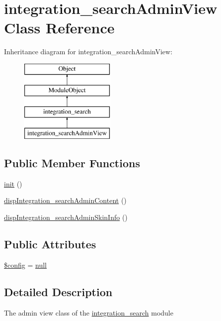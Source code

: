 \hypertarget{classintegration__searchAdminView}{}\section{integration\+\_\+search\+Admin\+View Class Reference}
\label{classintegration__searchAdminView}
Inheritance diagram for integration\+\_\+search\+Admin\+View\+:\begin{figure}[H]
\begin{center}
\leavevmode
\includegraphics[height=4.000000cm]{classintegration__searchAdminView}
\end{center}
\end{figure}
\subsection*{Public Member Functions}
\begin{DoxyCompactItemize}
\item 
\hyperlink{classintegration__searchAdminView_af4c9058a54a1923c25d9c90aeb405887}{init} ()
\item 
\hyperlink{classintegration__searchAdminView_a2ae221c755a586cd2af8d1758edc01c6}{disp\+Integration\+\_\+search\+Admin\+Content} ()
\item 
\hyperlink{classintegration__searchAdminView_a3699d7f7d9f12795783a1cc4d42fcba2}{disp\+Integration\+\_\+search\+Admin\+Skin\+Info} ()
\end{DoxyCompactItemize}
\subsection*{Public Attributes}
\begin{DoxyCompactItemize}
\item 
\hyperlink{classintegration__searchAdminView_ae36349da9a0e5548b5fdc222420a5bc5}{\$config} = \hyperlink{modernizr_8min_8js_a286f9ec831c5e676eeb493248eab9575}{null}
\end{DoxyCompactItemize}


\subsection{Detailed Description}
The admin view class of the \hyperlink{classintegration__search}{integration\+\_\+search} module

